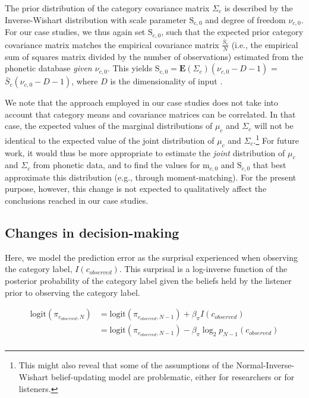 \documentclass[
  11pt,
  man,floatsintext]{apa6}
\begin{document}
The prior distribution of the category covariance matrix \(\Sigma_c\) is described by the Inverse-Wishart distribution with scale parameter \(\mathrm{S_{c,0}}\) and degree of freedom \(\nu_{c,0}\). For our case studies, we thus again set \(\mathrm{S_{c,0}}\), such that the expected prior category covariance matrix matches the empirical covariance matrix \(\frac{\bar{S}_c}{N}\) (i.e., the empirical sum of squares matrix divided by the number of observations) estimated from the phonetic database \emph{given \(\nu_{c,0}\)}. This yields \(\mathrm{S_{c,0}} = \mathbf{E}(\Sigma_c)(\nu_{c,0}-D-1)\) = \(\bar{S}_c(\nu_{c,0}-D-1)\), where \(D\) is the dimensionality of input \autocite[i.e., the number of phonetic cues considered, cf.][p.~134-5]{murphy2012}.

We note that the approach employed in our case studies does not take into account that category means and covariance matrices can be correlated. In that case, the expected values of the marginal distributions of \(\mu_c\) and \(\Sigma_c\) will not be identical to the expected value of the joint distribution of \(\mu_c\) and \(\Sigma_c\).\footnote{This might also reveal that some of the assumptions of the Normal-Inverse-Wishart belief-updating model are problematic, either for researchers or for listeners.} For future work, it would thus be more appropriate to estimate the \emph{joint} distribution of \(\mu_c\) and \(\Sigma_c\) from phonetic data, and to find the values for \(\mathrm{m}_{c,0}\) and \(\mathrm{S}_{c,0}\) that best approximate this distribution (e.g., through moment-matching). For the present purpose, however, this change is not expected to qualitatively affect the conclusions reached in our case studies.

\subsection{Changes in decision-making}\label{sec:SI-models-changes-in-decision-making}

Here, we model the prediction error as the surprisal experienced when observing the category label, \(I(c_{observed})\). This surprisal is a log-inverse function of the posterior probability of the category label given the beliefs held by the listener prior to observing the category label.

\begin{equation}\label{eq:bias-updating}
\begin{split}
\mathrm{logit}(\pi_{c_{observed},N}) & = \mathrm{logit}(\pi_{c_{observed},N-1}) + \beta_{\pi} I(c_{observed}) \\
                          & = \mathrm{logit}(\pi_{c_{observed},N-1}) - \beta_{\pi} \log_2 p_{N-1}(c_{observed}) \\
\end{split}
\end{equation}
\end{document}
